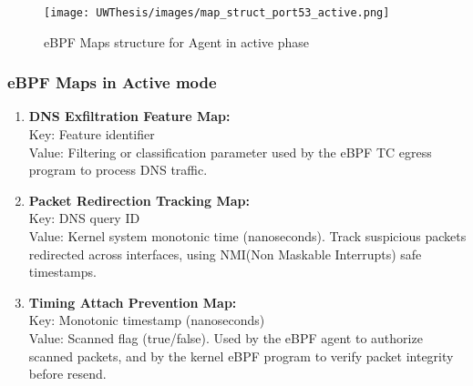 \documentclass [11pt, proquest] {uwthesis}[2020/02/24]
\begin{document}
\begin{figure}[htbp]
\centering
\texttt{[image: UWThesis/images/map\_struct\_port53\_active.png]}
\caption{eBPF Maps structure for Agent in active phase}
\label{sec:dp_eBPF_LRU_Maps_active}
\end{figure}

\subsubsection{\textbf{eBPF Maps in Active mode}}
\begin{enumerate}[itemsep=1pt,parsep=0pt]
\label{sec:maps}
\item \textbf{DNS Exfiltration Feature Map:} \\
Key: Feature identifier \\
Value: Filtering or classification parameter used by the eBPF TC egress program to process DNS traffic.

\item \textbf{Packet Redirection Tracking Map:} \\
Key: DNS query ID \\
Value: Kernel system monotonic time (nanoseconds). Track suspicious packets redirected across interfaces, using NMI(Non Maskable Interrupts) safe timestamps.

\item \textbf{Timing Attach Prevention Map:} \\
Key: Monotonic timestamp (nanoseconds) \\
Value: Scanned flag (true/false). Used by the eBPF agent to authorize scanned packets, and by the kernel eBPF program to verify packet integrity before resend.
\end{enumerate}
\end{document}
